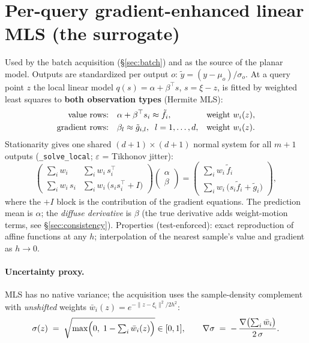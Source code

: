 \documentclass[11pt,a4paper]{article}
\newcommand{\code}[1]{\texttt{#1}}
\newcommand{\xxi}{\xi}
\begin{document}
\section{Per-query gradient-enhanced linear MLS (the surrogate)}
Used by the batch acquisition (\S\ref{sec:batch}) and as the source of the
planar model. Outputs are standardized per output $o$:
$\tilde y = (y-\mu_o)/\sigma_o$. At a query point $z$ the local linear model
$q(s) = \alpha + \beta^{\top}s$, $s = \xxi - z$, is fitted by weighted least
squares to \textbf{both observation types} (Hermite MLS):
\begin{align}
\text{value rows:}&\quad \alpha + \beta^{\top}s_i \approx \tilde f_i,
&&\text{weight } w_i(z), \notag\\
\text{gradient rows:}&\quad \beta_l \approx \tilde g_{i,l},\;\; l=1,\dots,d,
&&\text{weight } w_i(z). \notag
\end{align}
Stationarity gives one shared $(d{+}1)\times(d{+}1)$ normal system for all
$m{+}1$ outputs (\code{\_solve\_local}; $\varepsilon$ = Tikhonov jitter):
\begin{equation}
\begin{pmatrix}
\sum_i w_i & \sum_i w_i\, s_i^{\top} \\[3pt]
\sum_i w_i\, s_i & \sum_i w_i\,\bigl(s_i s_i^{\top} + I\bigr)
\end{pmatrix}
\begin{pmatrix}\alpha\\[3pt] \beta\end{pmatrix}
=
\begin{pmatrix}
\sum_i w_i\, \tilde f_i \\[3pt]
\sum_i w_i\,\bigl(s_i \tilde f_i + \tilde g_i\bigr)
\end{pmatrix},
\label{eq:mlsnormal}
\end{equation}
where the $+I$ block is the contribution of the gradient equations.
The prediction mean is $\alpha$; the \emph{diffuse derivative} is $\beta$
(the true derivative adds weight-motion terms, see \S\ref{sec:consistency}).
Properties (test-enforced): exact reproduction of affine functions at any
$h$; interpolation of the nearest sample's value and gradient as $h \to 0$.

\paragraph{Uncertainty proxy.} MLS has no native variance; the acquisition
uses the sample-density complement with \emph{unshifted} weights
$\bar w_i(z) = e^{-\lVert z-\xxi_i\rVert^2/2h^2}$:
\begin{equation}
\sigma(z) \;=\; \sqrt{\max\Bigl(0,\; 1 - \textstyle\sum_i \bar w_i(z)\Bigr)} \in [0,1],
\qquad
\nabla\sigma \;=\; -\,\frac{\nabla\bigl(\sum_i \bar w_i\bigr)}{2\,\sigma}.
\end{equation}
\end{document}

